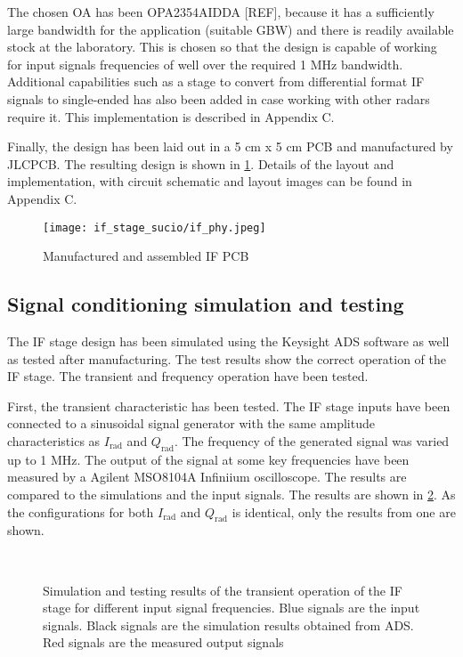 The chosen OA has been OPA2354AIDDA [REF], because it has a sufficiently large bandwidth for the application (suitable GBW) and there is readily available stock at the laboratory. This is chosen so that the design is capable of working for input signals frequencies of well over the required 1 MHz bandwidth. Additional capabilities such as a stage to convert from differential format IF signals to single-ended has also been added in case working with other radars require it. This implementation is described in Appendix C. %

Finally, the design has been laid out in a 5 cm x 5 cm PCB and manufactured by JLCPCB. The resulting design is shown in \cref{fig:if_phy}. Details of the layout and implementation, with circuit schematic and layout images can be found in Appendix C. %

\begin{figure}[h]
	\centering
	\texttt{[image: if\_stage\_sucio/if\_phy.jpeg]}
	\caption{Manufactured and assembled IF PCB}
	\label{fig:if_phy}
\end{figure}

\subsection{Signal conditioning simulation and testing}

The IF stage design has been simulated using the Keysight ADS software as well as tested after manufacturing. The test results show the correct operation of the IF stage. The transient and frequency operation have been tested.

First, the transient characteristic has been tested. The IF stage inputs have been connected to a sinusoidal signal generator with the same amplitude characteristics as $I_\mathrm{rad}$ and $Q_\mathrm{rad}$. The frequency of the generated signal was varied up to 1 MHz. The output of the signal at some key frequencies have been measured by a Agilent MSO8104A Infiniium oscilloscope. The results are compared to the simulations and the input signals. The results are shown in \cref{fig:if_signal_test}. As the configurations for both $I_\mathrm{rad}$ and $Q_\mathrm{rad}$ is identical, only the results from one are shown.

\begin{figure}[htb]
	\centering
	 \\
	\caption{Simulation and testing results of the transient operation of the IF stage for different input signal frequencies. Blue signals are the input signals. Black signals are the simulation results obtained from ADS. Red signals are the measured output signals \label{fig:if_signal_test}}
\end{figure}

